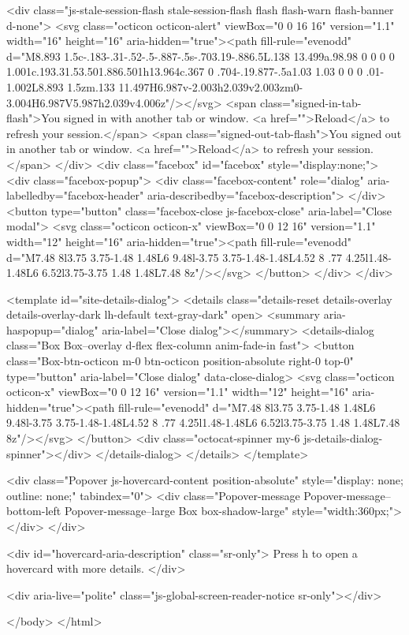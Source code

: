   <div class="js-stale-session-flash stale-session-flash flash flash-warn flash-banner d-none">
    <svg class="octicon octicon-alert" viewBox="0 0 16 16" version="1.1" width="16" height="16" aria-hidden="true"><path fill-rule="evenodd" d="M8.893 1.5c-.183-.31-.52-.5-.887-.5s-.703.19-.886.5L.138 13.499a.98.98 0 0 0 0 1.001c.193.31.53.501.886.501h13.964c.367 0 .704-.19.877-.5a1.03 1.03 0 0 0 .01-1.002L8.893 1.5zm.133 11.497H6.987v-2.003h2.039v2.003zm0-3.004H6.987V5.987h2.039v4.006z"/></svg>
    <span class="signed-in-tab-flash">You signed in with another tab or window. <a href="">Reload</a> to refresh your session.</span>
    <span class="signed-out-tab-flash">You signed out in another tab or window. <a href="">Reload</a> to refresh your session.</span>
  </div>
  <div class="facebox" id="facebox" style="display:none;">
  <div class="facebox-popup">
    <div class="facebox-content" role="dialog" aria-labelledby="facebox-header" aria-describedby="facebox-description">
    </div>
    <button type="button" class="facebox-close js-facebox-close" aria-label="Close modal">
      <svg class="octicon octicon-x" viewBox="0 0 12 16" version="1.1" width="12" height="16" aria-hidden="true"><path fill-rule="evenodd" d="M7.48 8l3.75 3.75-1.48 1.48L6 9.48l-3.75 3.75-1.48-1.48L4.52 8 .77 4.25l1.48-1.48L6 6.52l3.75-3.75 1.48 1.48L7.48 8z"/></svg>
    </button>
  </div>
</div>

  <template id="site-details-dialog">
  <details class="details-reset details-overlay details-overlay-dark lh-default text-gray-dark" open>
    <summary aria-haspopup="dialog" aria-label="Close dialog"></summary>
    <details-dialog class="Box Box--overlay d-flex flex-column anim-fade-in fast">
      <button class="Box-btn-octicon m-0 btn-octicon position-absolute right-0 top-0" type="button" aria-label="Close dialog" data-close-dialog>
        <svg class="octicon octicon-x" viewBox="0 0 12 16" version="1.1" width="12" height="16" aria-hidden="true"><path fill-rule="evenodd" d="M7.48 8l3.75 3.75-1.48 1.48L6 9.48l-3.75 3.75-1.48-1.48L4.52 8 .77 4.25l1.48-1.48L6 6.52l3.75-3.75 1.48 1.48L7.48 8z"/></svg>
      </button>
      <div class="octocat-spinner my-6 js-details-dialog-spinner"></div>
    </details-dialog>
  </details>
</template>

  <div class="Popover js-hovercard-content position-absolute" style="display: none; outline: none;" tabindex="0">
  <div class="Popover-message Popover-message--bottom-left Popover-message--large Box box-shadow-large" style="width:360px;">
  </div>
</div>

<div id="hovercard-aria-description" class="sr-only">
  Press h to open a hovercard with more details.
</div>

  <div aria-live="polite" class="js-global-screen-reader-notice sr-only"></div>

  </body>
</html>

